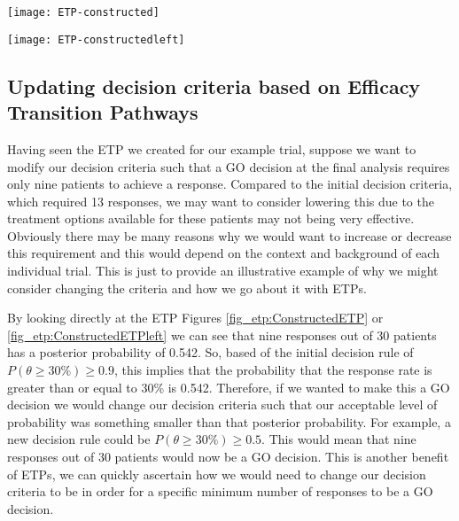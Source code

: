\begin{sidewaysfigure}
	\centering
	\caption{Example of a constructed ETP.}
	\label{fig_etp:ConstructedETP}
	\texttt{[image: ETP-constructed]}
\end{sidewaysfigure}

\begin{sidewaysfigure}
	\centering
	\caption{A left aligned version of the constructed ETP.}
	\label{fig_etp:ConstructedETPleft}
	\texttt{[image: ETP-constructedleft]}
\end{sidewaysfigure}

\newpage

\subsection{Updating decision criteria based on Efficacy Transition Pathways} 
\label{etp:updatingETPs}

Having seen the ETP we created for our example trial, suppose we want to modify our decision criteria such that a GO decision at the final analysis requires only nine patients to achieve a response. Compared to the initial decision criteria, which required 13 responses, we may want to  consider lowering this due to the treatment options available for these patients may not being very effective. Obviously there may be many reasons why we would want to increase or decrease this requirement and this would depend on the context and background of each individual trial. This is just to provide an illustrative example of why we might consider changing the criteria and how we go about it with ETPs. 

By looking directly at the ETP Figures \ref{fig_etp:ConstructedETP} or \ref{fig_etp:ConstructedETPleft} we can see that nine responses out of 30 patients has a posterior probability of 0.542. So, based of the initial decision rule of $P(\theta  \geq 30\%) \geq 0.9$, this implies that the probability that the response rate is greater than or equal to 30\% is 0.542. Therefore, if we wanted to make this a GO decision we would change our decision criteria such that our acceptable level of probability was something smaller than that posterior probability. For example, a new decision rule could be $P(\theta  \geq 30\%) \geq 0.5$. This would mean that nine responses out of 30 patients would now be a GO decision. This is another benefit of ETPs, we can quickly ascertain how we would need to change our decision criteria to be in order for a specific minimum number of responses to be a GO decision. 

